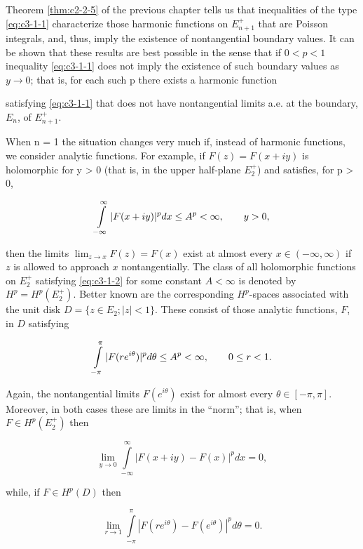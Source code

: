Theorem \ref{thm:c2-2-5} of the previous chapter tells us that inequalities of the type \eqref{eq:c3-1-1} characterize those harmonic functions on $E_{n+1}^{+}$ that are Poisson integrals, and, thus, imply the existence of nontangential boundary values. It can be shown that these results are best possible in the sense that if $0 < p < 1$ inequality \eqref{eq:c3-1-1} does not imply the existence of such boundary values as $y \to 0$; that is, for each such p there exists a harmonic function

satisfying \eqref{eq:c3-1-1} that does not have nontangential limits a.e. at the boundary, $E_{n}$, of $E_{n+1}^{+}$.

When n = 1 the situation changes very much if, instead of harmonic functions, we consider analytic functions. For example, if $F(z) = F(x + iy)$ is holomorphic for y > 0 (that is, in the upper half-plane $E_{2}^{+}$) and satisfies, for p > 0,

\begin{equation}\label{eq:c3-1-2}
\intop_{-\infty}^{\infty}|F(x+i y)|^{p}d x\leq A^{p}<\infty,\qquad y>0,
\end{equation}

then the limits $\lim_{z \to x} F(z) = F(x)$ exist at almost every $x \in (-\infty, \infty)$ if $z$ is allowed to approach $x$ nontangentially. The class of all holomorphic functions on $E_2^+$ satisfying \eqref{eq:c3-1-2} for some constant $A < \infty$ is denoted by $H^p = H^p(E_2^+)$. Better known are the corresponding $H^p$-spaces associated with the unit disk $D = \{z \in E_2; |z| < 1\}$. These consist of those analytic functions, $F$, in $D$ satisfying

\begin{equation}\label{eq:c3-1-3}
\intop_{-\pi}^{\pi}|F(r e^{i\theta})|^{p}d\theta\leq A^{p}<\infty,\qquad0\leq r<1.
\end{equation}

Again, the nontangential limits $F(e^{i\theta})$ exist for almost every $\theta \in [-\pi, \pi]$. Moreover, in both cases these are limits in the ``norm''; that is, when $F \in H^p(E_2^+)$ then

\begin{equation}\label{eq:c3-1-4}
\lim_{y\to0}\int\limits_{-\infty}^{\infty}|F(x+i y)-F(x)|^{p} dx=0,
\end{equation}

while, if $F \in H^{p}(D)$ then

\begin{equation}
\tag{1.4$'$}\label{eq:c3-1-4p}
\lim_{r\to1}\int\limits_{-\pi}^{\pi}|F(re^{i\theta})-F(e^{i\theta})|^{p}d\theta=0.
\end{equation}

